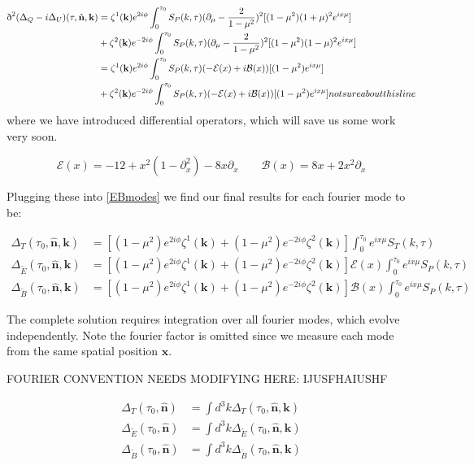\documentclass[a4paper,11pt]{article}
\renewcommand{\v}[1]{\mathbf{#1}}
\newcommand{\unit}[1]{\hat{\v{#1}}}
\newcommand{\sr}{\text{\normalfont\dh}}
\begin{document}
\begin{align}
\sr^2(\Delta_Q-i\Delta_U)(\tau,\unit{n},\v{k}) &= \zeta^1(\v{k})e^{2i\phi}\int_0^{\tau_0}S_P(k,\tau)(\partial_\mu-\frac{2}{1-\mu^2})^2[(1-\mu^2)(1+\mu)^2 e^{ix\mu}] \\ 
&{} + \zeta^2(\v{k})e^{-2i\phi}\int_0^{\tau_0}S_P(k,\tau)(\partial_\mu-\frac{2}{1-\mu^2})^2[(1-\mu^2)(1-\mu)^2 e^{ix\mu}]\\
&= \zeta^1(\v{k})e^{2i\phi}\int_0^{\tau_0}S_P(k,\tau)(-\mathcal{E}(x)+i\mathcal{B}(x))[(1-\mu^2) e^{ix\mu}] \\
&{} + \zeta^2(\v{k})e^{-2i\phi}\int_0^{\tau_0}S_P(k,\tau)(-\mathcal{E}(x)+i\mathcal{B}(x))[(1-\mu^2) e^{ix\mu}] not sure about this line
\end{align}
where we have introduced differential operators, which will save us some work very soon.

\begin{equation}
\mathcal{E}(x)=-12+x^2(1-\partial^2_x)-8x\partial_x \qquad \mathcal{B}(x) = 8x+2x^2\partial_x
\end{equation}

Plugging these into \ref{EBmodes} we find our final results for each fourier mode to be:

\begin{align}
\Delta_T(\tau_0,\unit{n},\v{k}) &= [(1-\mu^2) e^{2i\phi} \zeta^1(\v{k})+(1-\mu^2) e^{-2i\phi} \zeta^2(\v{k})]\int_0^{\tau_0} e^{ix\mu}S_T(k,\tau)\\
\Delta_{\tilde{E}}(\tau_0,\unit{n},\v{k}) &= [(1-\mu^2) e^{2i\phi} \zeta^1(\v{k})+(1-\mu^2) e^{-2i\phi} \zeta^2(\v{k})]\mathcal{E}(x)\int_0^{\tau_0} e^{ix\mu}S_P(k,\tau)\\
\Delta_{\tilde{B}}(\tau_0,\unit{n},\v{k}) &= [(1-\mu^2) e^{2i\phi} \zeta^1(\v{k})+(1-\mu^2) e^{-2i\phi} \zeta^2(\v{k})]\mathcal{B}(x)\int_0^{\tau_0} e^{ix\mu}S_P(k,\tau)
\end{align}

The complete solution requires integration over all fourier modes, which evolve independently. Note the fourier factor is omitted since we measure each mode from the same spatial position $\v{x}$.

FOURIER CONVENTION NEEDS MODIFYING HERE: IJUSFHAIUSHF

\begin{align}
\Delta_T(\tau_0,\unit{n}) &= \int d^3k \Delta_T(\tau_0,\unit{n},\v{k})\\
\Delta_{\tilde{E}}(\tau_0,\unit{n}) &= \int d^3k\Delta_{\tilde{E}}(\tau_0,\unit{n},\v{k})\\
\Delta_{\tilde{B}}(\tau_0,\unit{n}) &= \int d^3k\Delta_{\tilde{B}}(\tau_0,\unit{n},\v{k})
\end{align}
\end{document}
